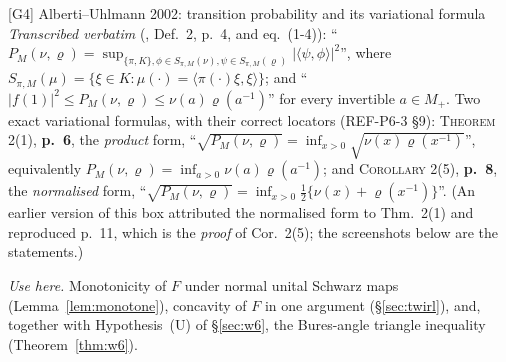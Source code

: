 \documentclass[11pt]{article}
\theoremstyle{definition}\newtheorem{example}[theorem]{Example}
\begin{document}
\begin{citedbox}{[G4] Alberti--Uhlmann 2002: transition probability and its variational
formula}
\emph{Transcribed verbatim} (\cite{AU02}, Def.~2, p.~4, and eq.~(1-4)):
``$P_M(\nu,\varrho)=\sup_{\{\pi,K\},\phi\in S_{\pi,M}(\nu),\psi\in S_{\pi,M}(\varrho)}
|\langle\psi,\phi\rangle|^2$'', where $S_{\pi,M}(\mu)=\{\xi\in K:\mu(\cdot)=\langle\pi(\cdot)\xi,
\xi\rangle\}$; and ``$|f(1)|^2\le P_M(\nu,\varrho)\le\nu(a)\varrho(a^{-1})$'' for every invertible
$a\in M_+$.  Two exact variational formulas, with their correct locators (REF-P6-3 \S9):
\textsc{Theorem 2}(1), \textbf{p.~6}, the \emph{product} form,
``$\sqrt{P_M(\nu,\varrho)}=\inf_{x>0}\sqrt{\nu(x)\varrho(x^{-1})}$'', equivalently
$P_M(\nu,\varrho)=\inf_{a>0}\nu(a)\varrho(a^{-1})$; and \textsc{Corollary 2}(5), \textbf{p.~8},
the \emph{normalised} form,
``$\sqrt{P_M(\nu,\varrho)}=\inf_{x>0}\frac12\{\nu(x)+\varrho(x^{-1})\}$''.  (An earlier version
of this box attributed the normalised form to Thm.~2(1) and reproduced p.~11, which is the
\emph{proof} of Cor.~2(5); the screenshots below are the statements.)

\emph{Use here.}  Monotonicity of $F$ under normal unital Schwarz maps
(Lemma~\ref{lem:monotone}), concavity of $F$ in one argument (\S\ref{sec:twirl}), and, together
with Hypothesis~(U) of \S\ref{sec:w6}, the Bures-angle triangle inequality
(Theorem~\ref{thm:w6}).

\smallskip\noindent{}

\smallskip\noindent{}
\end{citedbox}
\end{document}
